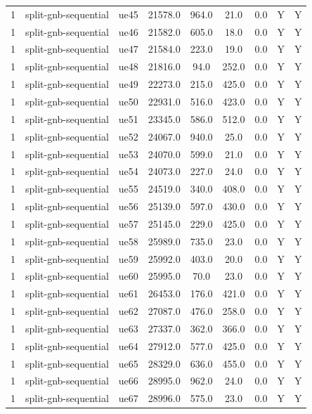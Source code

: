 \begin{table}[ht]
\begin{tabular}{|c|c|c|c|c|c|c|c|c|}
1 & split-gnb-sequential & ue45 & 21578.0 & 964.0 & 21.0 & 0.0 & Y & Y \\
1 & split-gnb-sequential & ue46 & 21582.0 & 605.0 & 18.0 & 0.0 & Y & Y \\
1 & split-gnb-sequential & ue47 & 21584.0 & 223.0 & 19.0 & 0.0 & Y & Y \\
1 & split-gnb-sequential & ue48 & 21816.0 & 94.0 & 252.0 & 0.0 & Y & Y \\
1 & split-gnb-sequential & ue49 & 22273.0 & 215.0 & 425.0 & 0.0 & Y & Y \\
1 & split-gnb-sequential & ue50 & 22931.0 & 516.0 & 423.0 & 0.0 & Y & Y \\
1 & split-gnb-sequential & ue51 & 23345.0 & 586.0 & 512.0 & 0.0 & Y & Y \\
1 & split-gnb-sequential & ue52 & 24067.0 & 940.0 & 25.0 & 0.0 & Y & Y \\
1 & split-gnb-sequential & ue53 & 24070.0 & 599.0 & 21.0 & 0.0 & Y & Y \\
1 & split-gnb-sequential & ue54 & 24073.0 & 227.0 & 24.0 & 0.0 & Y & Y \\
1 & split-gnb-sequential & ue55 & 24519.0 & 340.0 & 408.0 & 0.0 & Y & Y \\
1 & split-gnb-sequential & ue56 & 25139.0 & 597.0 & 430.0 & 0.0 & Y & Y \\
1 & split-gnb-sequential & ue57 & 25145.0 & 229.0 & 425.0 & 0.0 & Y & Y \\
1 & split-gnb-sequential & ue58 & 25989.0 & 735.0 & 23.0 & 0.0 & Y & Y \\
1 & split-gnb-sequential & ue59 & 25992.0 & 403.0 & 20.0 & 0.0 & Y & Y \\
1 & split-gnb-sequential & ue60 & 25995.0 & 70.0 & 23.0 & 0.0 & Y & Y \\
1 & split-gnb-sequential & ue61 & 26453.0 & 176.0 & 421.0 & 0.0 & Y & Y \\
1 & split-gnb-sequential & ue62 & 27087.0 & 476.0 & 258.0 & 0.0 & Y & Y \\
1 & split-gnb-sequential & ue63 & 27337.0 & 362.0 & 366.0 & 0.0 & Y & Y \\
1 & split-gnb-sequential & ue64 & 27912.0 & 577.0 & 425.0 & 0.0 & Y & Y \\
1 & split-gnb-sequential & ue65 & 28329.0 & 636.0 & 455.0 & 0.0 & Y & Y \\
1 & split-gnb-sequential & ue66 & 28995.0 & 962.0 & 24.0 & 0.0 & Y & Y \\
1 & split-gnb-sequential & ue67 & 28996.0 & 575.0 & 23.0 & 0.0 & Y & Y \\

\end{tabular}
\end{table}
